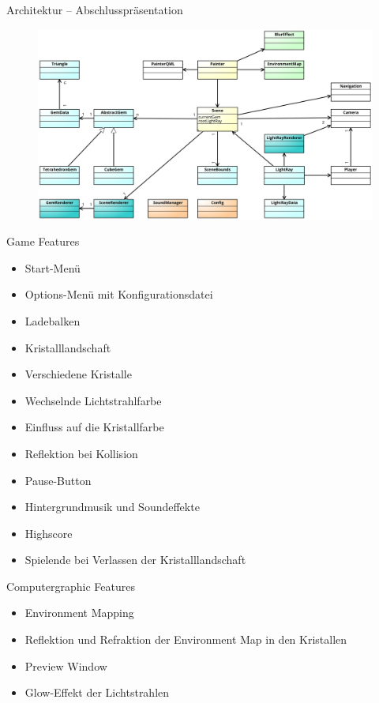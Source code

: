 \begin{frame}{Architektur -- Abschlusspräsentation}
	\begin{figure}
		\centering
		\includegraphics[width=\textwidth, height=0.7\textheight, keepaspectratio]{images/klassendiagramm-final}
	\end{figure}
\end{frame}

\begin{frame}{Game Features}
	\begin{itemize}
		\item Start-Menü
		\item Options-Menü mit Konfigurationsdatei
		\item Ladebalken
		\item Kristalllandschaft
		\item Verschiedene Kristalle
		\item Wechselnde Lichtstrahlfarbe
		\item Einfluss auf die Kristallfarbe
		\item Reflektion bei Kollision
		\item Pause-Button
		\item Hintergrundmusik und Soundeffekte
		\item Highscore
		\item Spielende bei Verlassen der Kristalllandschaft
	\end{itemize}
\end{frame}

\begin{frame}{Computergraphic Features}
	\begin{itemize}
		\item Environment Mapping
		\item Reflektion und Refraktion der Environment Map in den Kristallen
		\item Preview Window 
		\item Glow-Effekt der Lichtstrahlen
	\end{itemize}
\end{frame}

